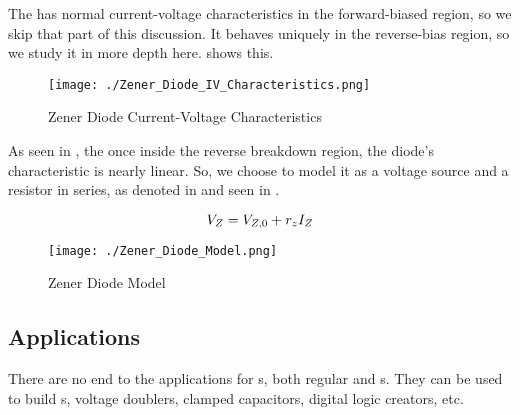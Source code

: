 The  has normal current-voltage characteristics in the forward-biased region, so we skip that part of this discussion.
It behaves uniquely in the reverse-bias region, so we study it in more depth here.
 shows this.

\begin{figure}[h!tbp]
  \centering
  \texttt{[image: ./Zener\_Diode\_IV\_Characteristics.png]}
  \caption{Zener Diode Current-Voltage Characteristics \parencite[p.~203]{sedraTextbook7}}
  \label{fig:Zener_Diode_IV_Characteristics}
\end{figure}

As seen in , the once inside the reverse breakdown region, the diode's characteristic is nearly linear.
So, we choose to model it as a voltage source and a resistor in series, as denoted in  and seen in .

\begin{equation}\label{eq:Zener_Diode_Model}
  V_{Z} = V_{Z,0} + r_{z} I_{Z}
\end{equation}

\begin{figure}[h!tbp]
  \centering
  \texttt{[image: ./Zener\_Diode\_Model.png]}
  \caption{Zener Diode Model \parencite[p.~204]{sedraTextbook7}}
  \label{fig:Zener_Diode_Model}
\end{figure}

\subsection{Applications}\label{subsec:Diode_Applications}
There are no end to the applications for s, both regular and s.
They can be used to build s, voltage doublers, clamped capacitors, digital logic creators, etc.


